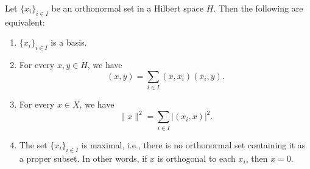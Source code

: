 \begin{Theorem}
\label{thm:hilbert-basis-equivalent-characterizations}
Let $\{x_i\}_{i\in I}$ be an orthonormal set in a Hilbert space $H$. Then the following are equivalent:\begin{enumerate}[label=(\roman*)]
\item $\{x_i\}_{i\in I}$ is a basis.
\item For every $x,y\in H$, we have
\begin{equation}\label{eq:hilbert-basis-inner-product-expansion}
(x,y)=\sum_{i\in I}(x,x_i)(x_i,y).
\end{equation}

\item For every $x\in X$, we have
\begin{equation}\label{eq:hilbert-basis-parseval-characterization}
\|x\|^2=\sum_{i\in I}|(x_i,x)|^2.
\end{equation}

\item The set $\{x_i\}_{i\in I}$ is maximal, i.e., there is no orthonormal set containing it as a proper subset. In other words, if $x$ is orthogonal to each $x_i$, then $x=0$.\end{enumerate}
\end{Theorem}

